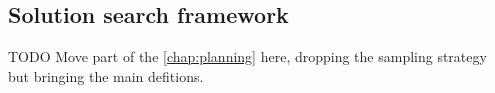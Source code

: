 \subsection{Solution search framework}

TODO Move part of the \cref{chap:planning} here, dropping the sampling
strategy but bringing the main defitions.

